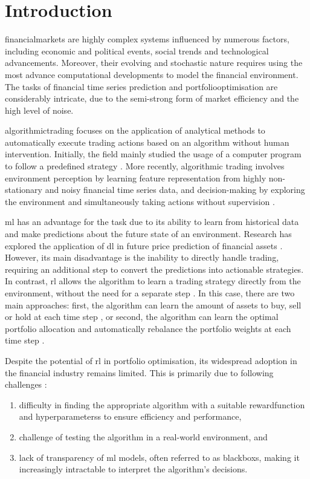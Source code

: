 \chapter{Introduction} \label{ch:introduction}

\Gls{financialmarkets} are highly complex systems influenced by numerous factors, including economic and political events, social trends and technological advancements. Moreover, their evolving and stochastic nature requires using the most advance computational developments to model the financial environment. The tasks of financial time series prediction and \gls{portfoliooptimisation} are considerably intricate, due to the semi-strong form of market efficiency and the high level of noise. \cite{Shen2020}

\Gls{algorithmictrading} focuses on the application of analytical methods to automatically execute trading actions based on an algorithm without human intervention. Initially, the field mainly studied the usage of a computer program to follow a predefined strategy \cite{Lei2020}. More recently, algorithmic trading involves environment perception by learning feature representation from highly non-stationary and noisy financial time series data, and decision-making by exploring the environment and simultaneously taking actions without supervision \cite{Ma2021}.

\acrfull{ml} has an advantage for the task due to its ability to learn from historical data and make predictions about the future state of an environment. Research has explored the application of \acrfull{dl} in future price prediction of financial assets \cite{Hasan2024,Nti2020,Shen2020,Wu2023}. However, its main disadvantage is the inability to directly handle trading, requiring an additional step to convert the predictions into actionable strategies. In contrast, \acrfull{rl} allows the algorithm to learn a trading strategy directly from the environment, without the need for a separate step \cite{Moody2001,Yang2020}. In this case, there are two main approaches: first, the algorithm can learn the amount of assets to buy, sell or hold at each time step \cite{Liu2018}, or second, the algorithm can learn the optimal portfolio allocation and automatically rebalance the portfolio weights at each time step \cite{Guan2021}.

Despite the potential of \acrshort{rl} in portfolio optimisation, its widespread adoption in the financial industry remains limited. This is primarily due to following challenges \cite{Cortes2024}:
\begin{enumerate}
    \item difficulty in finding the appropriate algorithm with a suitable \gls{rewardfunction} and \glspl{hyperparameters} to ensure efficiency and performance,
    \item challenge of testing the algorithm in a real-world environment, and
    \item lack of transparency of \acrshort{ml} models, often referred to as \glspl{blackbox}, making it increasingly intractable to interpret the algorithm's decisions.
\end{enumerate}

